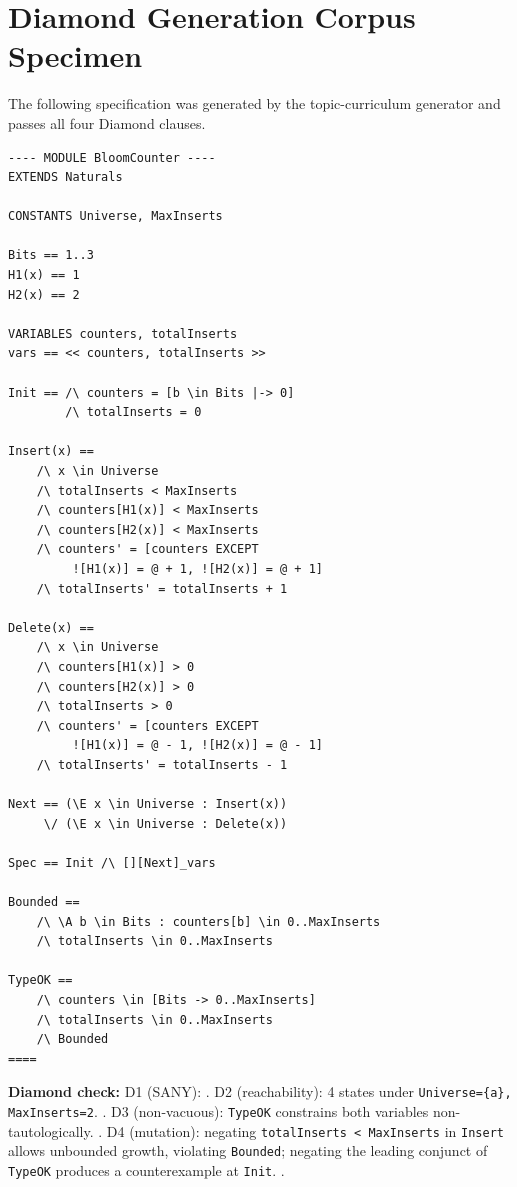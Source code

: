 \documentclass[11pt]{article}
\begin{document}
\section{Diamond Generation Corpus Specimen}
\label{sec:app-specimen}

The following specification was generated by the topic-curriculum
generator and passes all four Diamond clauses.

\begin{tcolorbox}[
  enhanced, breakable,
  colback=cbox, colframe=c3, boxrule=0.5pt,
  arc=2pt, left=6pt, right=6pt, top=3pt, bottom=3pt,
  title={\textbf{BloomCounter} --- topic: data\_structures; 4 states; Diamond tier~4}, fonttitle=\small,
]
\begin{verbatim}
---- MODULE BloomCounter ----
EXTENDS Naturals

CONSTANTS Universe, MaxInserts

Bits == 1..3
H1(x) == 1
H2(x) == 2

VARIABLES counters, totalInserts
vars == << counters, totalInserts >>

Init == /\ counters = [b \in Bits |-> 0]
        /\ totalInserts = 0

Insert(x) ==
    /\ x \in Universe
    /\ totalInserts < MaxInserts
    /\ counters[H1(x)] < MaxInserts
    /\ counters[H2(x)] < MaxInserts
    /\ counters' = [counters EXCEPT
         ![H1(x)] = @ + 1, ![H2(x)] = @ + 1]
    /\ totalInserts' = totalInserts + 1

Delete(x) ==
    /\ x \in Universe
    /\ counters[H1(x)] > 0
    /\ counters[H2(x)] > 0
    /\ totalInserts > 0
    /\ counters' = [counters EXCEPT
         ![H1(x)] = @ - 1, ![H2(x)] = @ - 1]
    /\ totalInserts' = totalInserts - 1

Next == (\E x \in Universe : Insert(x))
     \/ (\E x \in Universe : Delete(x))

Spec == Init /\ [][Next]_vars

Bounded ==
    /\ \A b \in Bits : counters[b] \in 0..MaxInserts
    /\ totalInserts \in 0..MaxInserts

TypeOK ==
    /\ counters \in [Bits -> 0..MaxInserts]
    /\ totalInserts \in 0..MaxInserts
    /\ Bounded
====
\end{verbatim}
\end{tcolorbox}

\noindent \textbf{Diamond check:}
D1 (SANY): \checkmark.
D2 (reachability): 4 states under \texttt{Universe=\{a\},
MaxInserts=2}. \checkmark.
D3 (non-vacuous): \texttt{TypeOK} constrains both variables
non-tautologically. \checkmark.
D4 (mutation): negating \texttt{totalInserts < MaxInserts} in
\texttt{Insert} allows unbounded growth, violating \texttt{Bounded};
negating the leading conjunct of \texttt{TypeOK} produces a
counterexample at \texttt{Init}. \checkmark.
\end{document}
